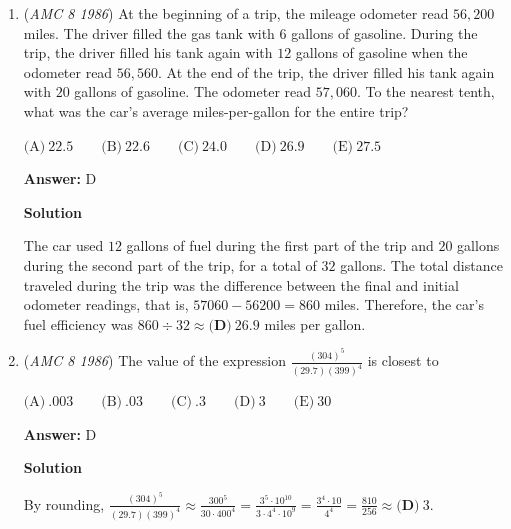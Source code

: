 \begin{enumerate}
 



\textbf{Solution 2}

As in Solution 1, one of the $60$ m sides must touch the wall.  The $60$ m side not touching the wall has $60 \div 12 + 1 = 6$ posts.  Each of the $36$ m sides has $36 \div 12 + 1 = 4$ posts.  Since $2$ posts are at intersections of $36$ m and $60$ m sides, there are a total of $6 + 2 \cdot 4 - 2 = \boxed{\textbf{(B)}\ 12}$ posts.

 


	\item (\textit{AMC 8 1986}) At the beginning of a trip, the mileage odometer read $56,200$ miles.  The driver filled the gas tank with $6$ gallons of gasoline.  During the trip, the driver filled his tank again with $12$ gallons of gasoline when the odometer read $56,560$.  At the end of the trip, the driver filled his tank again with $20$ gallons of gasoline.  The odometer read $57,060$.  To the nearest tenth, what was the car's average miles-per-gallon for the entire trip?


 $\text{(A)}\ 22.5 \qquad \text{(B)}\ 22.6 \qquad \text{(C)}\ 24.0 \qquad \text{(D)}\ 26.9 \qquad \text{(E)}\ 27.5$

 \textbf{Answer: }D



\textbf{Solution}

The car used $12$ gallons of fuel during the first part of the trip and $20$ gallons during the second part of the trip, for a total of $32$ gallons.  The total distance traveled during the trip was the difference between the final and initial odometer readings, that is, $57060 - 56200 = 860$ miles. Therefore, the car's fuel efficiency was $860 \div 32 \approx \boxed{\textbf{(D)}\ 26.9}$ miles per gallon.

 


	\item (\textit{AMC 8 1986}) The value of the expression $\frac{(304)^5}{(29.7)(399)^4}$ is closest to


 $\text{(A)}\ .003 \qquad \text{(B)}\ .03 \qquad \text{(C)}\ .3 \qquad \text{(D)}\ 3 \qquad \text{(E)}\ 30$

 \textbf{Answer: }D



\textbf{Solution}

By rounding, $\frac{(304)^5}{(29.7)(399)^4} \approx \frac{300^5}{30\cdot400^4} = \frac{3^5 \cdot 10^{10}}{3\cdot 4^4 \cdot 10^9} = \frac{3^4\cdot 10}{4^4} = \frac{810}{256} \approx \boxed{\textbf{(D)}\ 3}$.


\end{enumerate}
